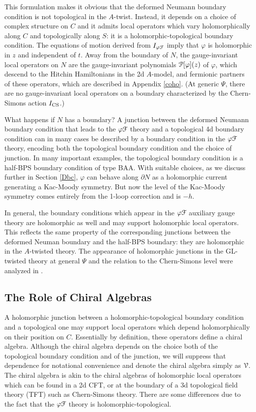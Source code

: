 \documentclass[11pt,a4paper]{article}
\begin{document}
This formulation makes it obvious that the deformed Neumann boundary condition is not topological in the $A$-twist. Instead, 
it depends on a choice of complex structure on $C$ and it admits local operators which vary holomorphically along $C$ and topologically along $S$: it is a holomorphic-topological boundary condition. The equations of motion derived
from $I_{\varphi{\mathcal F}}$ imply that $\varphi$ is holomorphic in $z$ and independent of $t$. 
Away from the boundary of $N$, the gauge-invariant  local operators on $N$ are the 
gauge-invariant polynomials  ${\cal P}[\varphi](z)$ of $\varphi$, which descend to the Hitchin Hamiltonians in the 2d $A$-model, and fermionic partners
of these operators, which are described in Appendix \ref{coho}.  (At generic $\Psi$, there are no
gauge-invariant local operators on a boundary characterized by the Chern-Simons action $I_{\mathrm{CS}}$.)  

What happens if $N$ has a boundary?  
A junction between the deformed Neumann boundary condition that leads to the $\varphi{\mathcal F}$ theory and a topological 4d boundary condition can in many cases be described by a boundary condition in the $\varphi{\mathcal F}$ theory,  encoding both the topological boundary condition and the choice of junction.  
In many important examples, the topological boundary condition is a half-BPS boundary condition of type BAA.
 With suitable choices, as we discuss further in Section \ref{Dbc}, $\varphi$ can behave  along $\partial N$ as a holomorphic current generating a Kac-Moody symmetry.  
  But now the level of the Kac-Moody symmetry comes entirely from the 1-loop 
correction and is $-h$.   





In general, the boundary conditions which appear in the $\varphi{\mathcal F}$
 auxiliary gauge theory are holomorphic as well and may support holomorphic local operators. This reflects the same property of the corresponding junctions between the deformed Neuman boundary and the half-BPS boundary: they are holomorphic in the $A$-twisted theory. The appearance of holomorphic junctions in the GL-twisted theory at general $\Psi$ and the relation to the Chern-Simons level were analyzed in \cite{Gaiotto:2017euk}. 

\subsection{The Role of Chiral Algebras} \label{RoleChiral}
A holomorphic junction between a holomorphic-topological boundary condition and a topological one
may support local operators which depend holomorphically on their position on $C$. Essentially by definition, these operators define a chiral algebra. Although the chiral algebra depends on the choice both of the topological boundary condition and of the junction, we will suppress that dependence for notational convenience and denote the
chiral algebra simply as ${\cal V}$. The chiral algebra is akin to the chiral algebras of holomorphic local operators which can be 
found in a 2d CFT, or at the boundary of a 3d topological field theory (TFT) 
 such as Chern-Simons theory. There are some differences  \cite{Costello:2020ndc}  due to the fact that the $\varphi {\mathcal F}$ theory is holomorphic-topological. 
\end{document}
